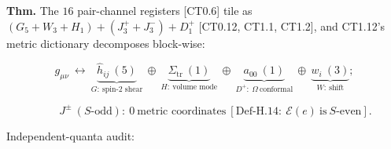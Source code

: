\begin{theorem}\label{tag:FT-30}
\textbf{Thm.} The $16$ pair-channel registers [CT0.6] tile as $(G_5+W_3+H_1)+(J^+_3+J^-_3)+D^+_1$ [CT0.12, CT1.1, CT1.2], and CT1.12's metric dictionary decomposes block-wise:

\[
g_{\mu\nu}\ \leftrightarrow\ \underbrace{\hat h_{ij}\ (5)}_{G:\ \text{spin-2 shear}}\ \oplus\ \underbrace{\Sigma_{\mathrm{tr}}\ (1)}_{H:\ \text{volume mode}}\ \oplus\ \underbrace{a_{00}\ (1)}_{D^+:\ \Omega\ \text{conformal}}\ \oplus\ \underbrace{w_i\ (3)}_{W:\ \text{shift}};
\]

\[
\qquad J^\pm\ (S\text{-odd}):\ 0\ \text{metric coordinates}\ [\mathrm{Def\text{-}H.14}:\ \mathcal E(e)\ \text{is}\ S\text{-even}].
\]

Independent-quanta audit:


\end{theorem}
